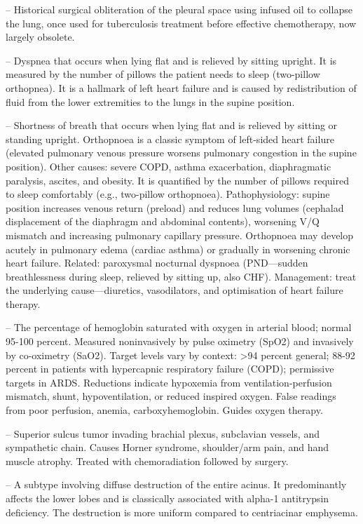 -- Historical surgical obliteration of the pleural space using infused oil to collapse the lung, once used for tuberculosis treatment before effective chemotherapy, now largely obsolete.

-- Dyspnea that occurs when lying flat and is relieved by sitting upright. It is measured by the number of pillows the patient needs to sleep (two-pillow orthopnea). It is a hallmark of left heart failure and is caused by redistribution of fluid from the lower extremities to the lungs in the supine position.

-- Shortness of breath that occurs when lying flat and is relieved by sitting or standing upright. Orthopnoea is a classic symptom of left-sided heart failure (elevated pulmonary venous pressure worsens pulmonary congestion in the supine position). Other causes: severe COPD, asthma exacerbation, diaphragmatic paralysis, ascites, and obesity. It is quantified by the number of pillows required to sleep comfortably (e.g., two-pillow orthopnoea). Pathophysiology: supine position increases venous return (preload) and reduces lung volumes (cephalad displacement of the diaphragm and abdominal contents), worsening V/Q mismatch and increasing pulmonary capillary pressure. Orthopnoea may develop acutely in pulmonary edema (cardiac asthma) or gradually in worsening chronic heart failure. Related: paroxysmal nocturnal dyspnoea (PND—sudden breathlessness during sleep, relieved by sitting up, also CHF). Management: treat the underlying cause—diuretics, vasodilators, and optimisation of heart failure therapy.

-- The percentage of hemoglobin saturated with oxygen in arterial blood; normal 95-100 percent. Measured noninvasively by pulse oximetry (SpO2) and invasively by co-oximetry (SaO2). Target levels vary by context: >94 percent general; 88-92 percent in patients with hypercapnic respiratory failure (COPD); permissive targets in ARDS. Reductions indicate hypoxemia from ventilation-perfusion mismatch, shunt, hypoventilation, or reduced inspired oxygen. False readings from poor perfusion, anemia, carboxyhemoglobin. Guides oxygen therapy.

-- Superior sulcus tumor invading brachial plexus, subclavian vessels, and sympathetic chain. Causes Horner syndrome, shoulder/arm pain, and hand muscle atrophy. Treated with chemoradiation followed by surgery.

-- A subtype involving diffuse destruction of the entire acinus. It predominantly affects the lower lobes and is classically associated with alpha-1 antitrypsin deficiency. The destruction is more uniform compared to centriacinar emphysema.

